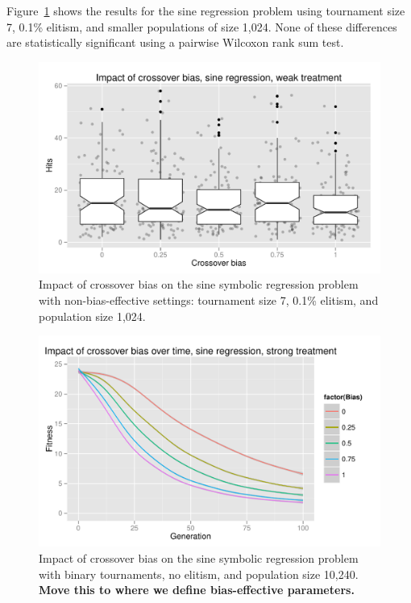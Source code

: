 \documentclass{sig-alternate}
\begin{document}
%
%
%
%

%
%
%
%

Figure~\ref{fig:sineBiasResultsWeak} shows the results for the sine regression problem using tournament size 7, 0.1\%
elitism, and smaller populations  of size 1,024. None of these differences are statistically significant using a
pairwise Wilcoxon rank sum test.

\begin{figure}
\centering
\includegraphics[width=0.45 \textwidth]{Plots/Sine_XO_impact_weak_boxplot.pdf}
\caption{Impact of crossover bias on the sine symbolic regression problem with non-bias-effective settings: tournament
size 7, 0.1\% elitism, and population size 1,024.}
\label{fig:sineBiasResultsWeak}
\end{figure}

\begin{figure}
\centering
\includegraphics[width=0.45 \textwidth]{Plots/Sine_XO_fitness_vs_gen_strong.pdf}
\caption{Impact of crossover bias on the sine symbolic regression problem with binary tournaments, no elitism, and 
population size 10,240. \textbf{Move this to where we define bias-effective parameters.}}
\label{fig:sineBiasFitnessVsGenStrong}
\end{figure}
\end{document}
